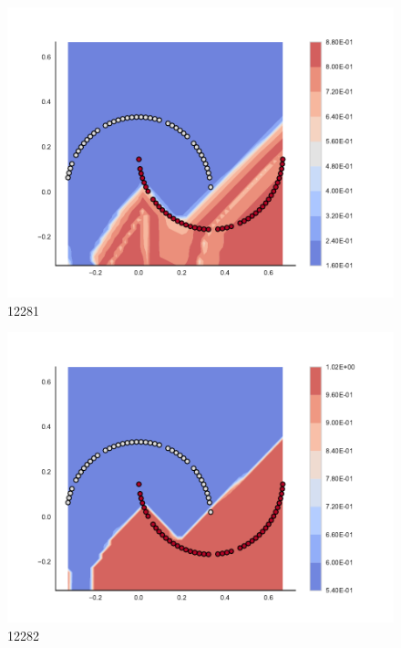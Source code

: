 \begin{subfigure}[b]{0.09\textwidth}
    \includegraphics[clip, trim=2.35cm 1.75cm 4.5cm 0cm,width=\textwidth]{img/convergence/12281.pdf}
    \caption{12281}
    \label{fig:convergence_12281}
\end{subfigure}
%
\begin{subfigure}[b]{0.09\textwidth}
    \includegraphics[clip, trim=2.35cm 1.75cm 4.5cm 0cm,width=\textwidth]{img/convergence/12282.pdf}
    \caption{12282}
    \label{fig:convergence_12282}
\end{subfigure}
%

